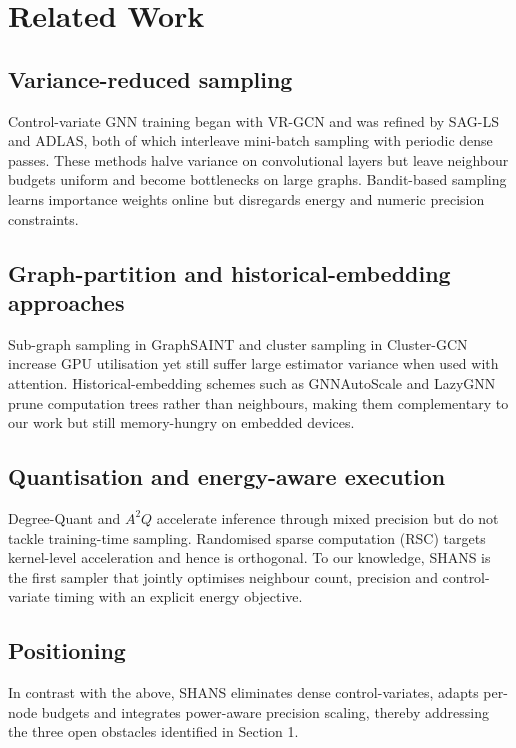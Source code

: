 \documentclass{article}
\begin{document}
\section{Related Work}
\subsection{Variance-reduced sampling}
Control-variate GNN training began with VR-GCN \cite{chen-2017-stochastic} and was refined by SAG-LS and ADLAS, both of which interleave mini-batch sampling with periodic dense passes. These methods halve variance on convolutional layers but leave neighbour budgets uniform and become bottlenecks on large graphs. Bandit-based sampling \cite{liu-2020-bandit} learns importance weights online but disregards energy and numeric precision constraints.
\subsection{Graph-partition and historical-embedding approaches}
Sub-graph sampling in GraphSAINT \cite{zeng-2019-graphsaint} and cluster sampling in Cluster-GCN \cite{chiang-2019-cluster} increase GPU utilisation yet still suffer large estimator variance when used with attention. Historical-embedding schemes such as GNNAutoScale \cite{fey-2021-gnnautoscale} and LazyGNN \cite{xue-2023-lazygnn} prune computation trees rather than neighbours, making them complementary to our work but still memory-hungry on embedded devices.
\subsection{Quantisation and energy-aware execution}
Degree-Quant \cite{tailor-2020-degree} and \(A^2Q\) \cite{zhu-2023-aggregation} accelerate inference through mixed precision but do not tackle training-time sampling. Randomised sparse computation (RSC) \cite{liu-2022-rsc} targets kernel-level acceleration and hence is orthogonal. To our knowledge, SHANS is the first sampler that jointly optimises neighbour count, precision and control-variate timing with an explicit energy objective.
\subsection{Positioning}
In contrast with the above, SHANS eliminates dense control-variates, adapts per-node budgets and integrates power-aware precision scaling, thereby addressing the three open obstacles identified in Section 1.
\end{document}
